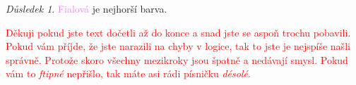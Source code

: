 \documentclass[12pt, a4paper]{article}
\theoremstyle{plain}
\theoremstyle{plain}
\theoremstyle{remark}
\newtheorem*{dusl}{Důsledek}
\begin{document}
	\begin{dusl}
		\textcolor{violet}{Fialová} je nejhorší barva.
	\end{dusl}
	
	\begin{center}
		{\small \textcolor{red}{Děkuji pokud jste text dočetli až do konce a snad jste se aspoň trochu pobavili. Pokud vám příjde, že jste narazili na chyby v logice, tak to jste je nejspíše našli správně. Protože skoro všechny mezikroky jsou špatně a nedávají smysl. Pokud vám to \textit{ftipné} nepřišlo, tak máte asi rádi písničku \textit{désolé}.}}
	\end{center}
	
\end{document}
